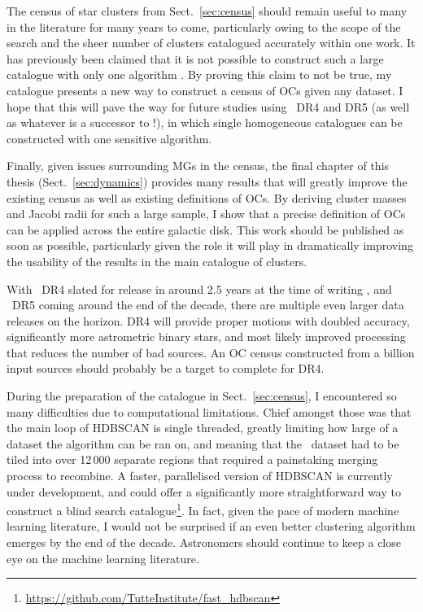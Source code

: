 The census of star clusters from Sect.~\ref{sec:census} should remain useful to many in the literature for many years to come, particularly owing to the scope of the search and the sheer number of clusters catalogued accurately within one work. It has previously been claimed that it is not possible to construct such a large catalogue with only one algorithm \citep{cantat-gaudin_clusters_2020}. By proving this claim to not be true, my catalogue presents a new way to construct a census of OCs given any dataset. I hope that this will pave the way for future studies using \gaia\ DR4 and DR5 (as well as whatever is a successor to \gaia!), in which single homogeneous catalogues can be constructed with one sensitive algorithm.

Finally, given issues surrounding MGs in the census, the final chapter of this thesis (Sect.~\ref{sec:dynamics}) provides many results that will greatly improve the existing census as well as existing definitions of OCs. By deriving cluster masses and Jacobi radii for such a large sample, I show that a precise definition of OCs can be applied across the entire galactic disk. This work should be published as soon as possible, particularly given the role it will play in dramatically improving the usability of the results in the main catalogue of clusters.

With \gaia\ DR4 slated for release in around 2.5 years at the time of writing \citep[no sooner than the end of 2025,][]{gaia_collaboration_gaia_2022}, and \gaia\ DR5 coming around the end of the decade, there are multiple even larger data releases on the horizon. DR4 will provide proper motions with doubled accuracy, significantly more astrometric binary stars, and most likely improved processing that reduces the number of bad sources. An OC census constructed from a billion input sources should probably be a target to complete for DR4.

During the preparation of the catalogue in Sect.~\ref{sec:census}, I encountered so many difficulties due to computational limitations. Chief amongst those was that the main loop of HDBSCAN is single threaded, greatly limiting how large of a dataset the algorithm can be ran on, and meaning that the \gaia\ dataset had to be tiled into over 12\,000 separate regions that required a painstaking merging process to recombine. A faster, parallelised version of HDBSCAN is currently under development, and could offer a significantly more straightforward way to construct a blind search catalogue\footnote{\url{https://github.com/TutteInstitute/fast_hdbscan}}. In fact, given the pace of modern machine learning literature, I would not be surprised if an even better clustering algorithm emerges by the end of the decade. Astronomers should continue to keep a close eye on the machine learning literature.

